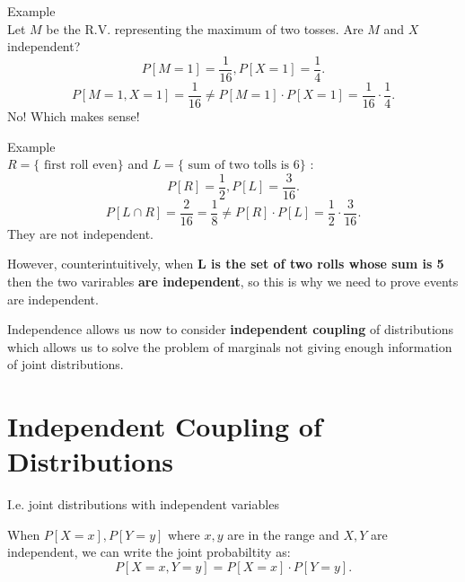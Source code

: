 \documentclass[a4paper]{article}
\begin{document}
\begin{note}{Example} \\
  Let $M$ be the R.V. representing the maximum of two tosses. Are $M$ and $X$ independent? 
  \[
    P[M=1] = \frac{1}{16}, P[X=1] = \frac{1}{4}
  .\] 
  \[
    P[M=1, X=1] = \frac{1}{16} \neq P[M=1] \cdot P[X=1] = \frac{1}{16} \cdot \frac{1}{4}
  .\] 
  No! Which makes sense!
\end{note}

\begin{note}{Example} \\
  $R = \{ \text{ first roll even} \}$ and $L = \{ \text{ sum of two tolls is 6} \}$ :
  \[
    P[R] = \frac{1}{2}, P[L]=\frac{3}{16}  
  .\] 
  \[
    P[L \cap R] = \frac{2}{16} = \frac{1}{8} \neq P[R] \cdot P[L] = \frac{1}{2} \cdot \frac{3}{16}
  .\] 
  They are not independent.

  However, counterintuitively, when \textbf{L is the set of two rolls whose sum is 5} then the two
  varirables \textbf{are independent}, so this is why we need to prove events are independent.
\end{note}

\begin{remark}
  Independence allows us now to consider \textbf{independent coupling} of distributions which
  allows us to solve the problem of marginals not giving enough information of joint distributions.
\end{remark}

\section{Independent Coupling of Distributions}
I.e. joint distributions with independent variables

\begin{definition}
  When $P[X=x], P[Y=y]$ where  $x,y$ are in the range and  $X,Y$  are independent, we can write the 
  joint probabiltity as:
  \[
    P[X=x, Y=y] = P[X=x] \cdot P[Y=y]
  .\] 
\end{definition}
\end{document}
